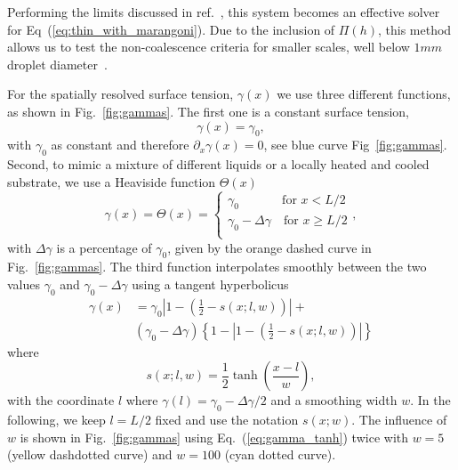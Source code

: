 Performing the limits discussed in ref.~\cite{PhysRevE.100.033313, PhysRevE.104.034801}, this system becomes an effective solver for Eq~(\ref{eq:thin_with_marangoni}).
Due to the inclusion of $\Pi(h)$, this method allows us to test the non-coalescence criteria for smaller scales, well below $1mm$ droplet diameter~\cite{doi:10.1021/la500459v, karpitschka2014sharp}.

For the spatially resolved surface tension, $\gamma(x)$ we use three different functions, as shown in Fig.~\ref{fig:gammas}.
The first one is a constant surface tension, 
\begin{equation}\label{eq:gamma_const}
    \gamma(x) = \gamma_0,
\end{equation}
with $\gamma_0$ as constant and therefore $\partial_x\gamma(x) = 0$, see blue curve Fig~\ref{fig:gammas}.
Second, to mimic a mixture of different liquids or a locally heated and cooled substrate, we use a Heaviside function $\Theta(x)$
\begin{equation}\label{eq:gamma_step}
    \gamma(x) = \Theta(x) = \begin{cases}
    \gamma_0\quad~~\qquad \text{for $x < L/2$}\\
    \gamma_0 - \Delta\gamma \quad \text{for $x \ge L/2$}\\
    \end{cases},
\end{equation}
with $\Delta\gamma$ is a percentage of $\gamma_0$, given by the orange dashed curve in Fig.~\ref{fig:gammas}.
The third function interpolates smoothly between the two values $\gamma_0$ and $\gamma_0 -\Delta\gamma$ using a tangent hyperbolicus
\begin{align}\label{eq:gamma_tanh}
    \gamma(x) &= \gamma_0\left|1 - \left(\frac{1}{2} - s(x;l,w)\right)\right| + \nonumber\\
    &(\gamma_0 - \Delta\gamma)\left\{1 - \left|1 - \left(\frac{1}{2} - s(x;l,w)\right)\right|\right\} 
\end{align}
where
\begin{equation}\label{eq:smoothing}
    s(x;l,w) = \frac{1}{2}\tanh\left(\frac{x - l}{w}\right),
\end{equation}
with the coordinate $l$ where $\gamma(l) = \gamma_0 -\Delta\gamma/2$ and a smoothing width $w$. 
In the following, we keep $l=L/2$ fixed and use the notation $s(x;w)$.
The influence of $w$ is shown in Fig.~\ref{fig:gammas} using Eq.~(\ref{eq:gamma_tanh}) twice with $w=5$ (yellow dashdotted curve) and $w=100$ (cyan dotted curve). 

